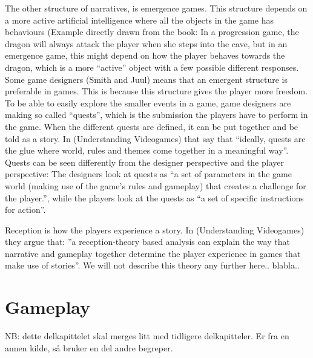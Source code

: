 The other structure of narratives, is emergence games. This structure depends on a more active artificial intelligence where all the objects in the game has behaviours (Example directly drawn from the book: In a progression game, the dragon will always attack the player when she steps into the cave, but in an emergence game, this might depend on how the player behaves towards the dragon, which is a more “active” object with a few possible different responses. Some game designers (Smith and Juul) means that an emergent structure is preferable in games. This is because this structure gives the player more freedom. To be able to easily explore the smaller events in a game, game designers are making so called “quests”, which is the submission the players have to perform in the game. When the different quests are defined, it can be put together and be told as a story. In (Understanding Videogames) that say that “ideally, quests are the glue where world, rules and themes come together in a meaningful way”. Quests can be seen differently from the designer perspective and the player perspective: The designers look at quests as “a set of parameters in the game world (making use of the game’s rules and gameplay) that creates a challenge for the player.”, while the players look at the quests as “a set of specific instructions for action”. 

Reception is how the players experience a story. In (Understanding Videogames) they argue that: ”a reception-theory based analysis can explain the way that narrative and gameplay together determine the player experience in games that make use of stories”. We will not describe this theory any further here.. blabla.. 

\section{Gameplay}
NB: dette delkapittelet skal merges litt med tidligere delkapitteler. Er fra en annen kilde, så bruker en del andre begreper.

